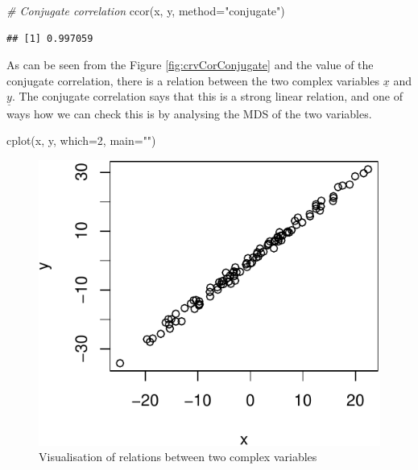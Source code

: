 \documentclass[
]{book}
\newenvironment{Shaded}{\begin{snugshade}}{\end{snugshade}}
\newcommand{\AttributeTok}[1]{\textcolor[rgb]{0.77,0.63,0.00}{#1}}
\newcommand{\CommentTok}[1]{\textcolor[rgb]{0.56,0.35,0.01}{\textit{#1}}}
\newcommand{\DecValTok}[1]{\textcolor[rgb]{0.00,0.00,0.81}{#1}}
\newcommand{\FunctionTok}[1]{\textcolor[rgb]{0.00,0.00,0.00}{#1}}
\newcommand{\NormalTok}[1]{#1}
\newcommand{\StringTok}[1]{\textcolor[rgb]{0.31,0.60,0.02}{#1}}
\begin{document}
\begin{Shaded}
\begin{Highlighting}[]
\CommentTok{\# Conjugate correlation}
\FunctionTok{ccor}\NormalTok{(x, y, }\AttributeTok{method=}\StringTok{"conjugate"}\NormalTok{)}
\end{Highlighting}
\end{Shaded}

\begin{verbatim}
## [1] 0.997059
\end{verbatim}

As can be seen from the Figure \ref{fig:crvCorConjugate} and the value of the conjugate correlation, there is a relation between the two complex variables \(\underline{x}\) and \(\underline{y}\). The conjugate correlation says that this is a strong linear relation, and one of ways how we can check this is by analysing the MDS of the two variables.

\begin{Shaded}
\begin{Highlighting}[]
\FunctionTok{cplot}\NormalTok{(x, y, }\AttributeTok{which=}\DecValTok{2}\NormalTok{, }\AttributeTok{main=}\StringTok{""}\NormalTok{)}
\end{Highlighting}
\end{Shaded}

\begin{figure}
\centering
\includegraphics{Svetunkov---Svetunkov---Complex-Valued-Econometrics_files/figure-latex/crvCorConjugateMDS-1.pdf}
\caption{\label{fig:crvCorConjugateMDS}Visualisation of relations between two complex variables}
\end{figure}
\end{document}
